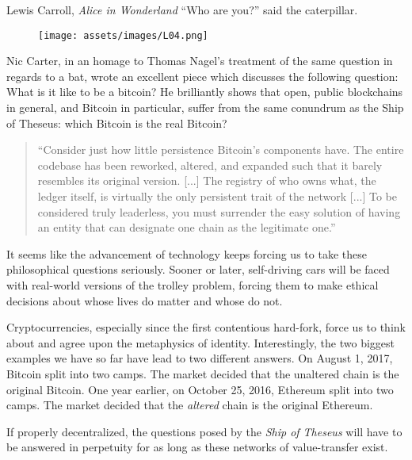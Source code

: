 \label{les:4}

\begin{chapquote}{Lewis Carroll, \textit{Alice in Wonderland}}
  ``Who are you?'' said the caterpillar.
\end{chapquote}

\begin{figure}
  \texttt{[image: assets/images/L04.png]}
  \label{fig:caterpillar}
\end{figure}

Nic Carter, in an homage to Thomas Nagel's treatment of the same
question in regards to a bat, wrote an excellent piece which discusses
the following question: What is it like to be a bitcoin? He
brilliantly shows that open, public blockchains in general, and Bitcoin
in particular, suffer from the same conundrum as the Ship of
Theseus: which Bitcoin is the real Bitcoin?

\begin{quotation}
``Consider just how little persistence Bitcoin's components have. The
entire codebase has been reworked, altered, and expanded such that it
barely resembles its original version. [...] The registry of who
owns what, the ledger itself, is virtually the only persistent trait
of the network [...]
To be considered truly leaderless, you must surrender the easy
solution of having an entity that can designate one chain as the
legitimate one.''
\end{quotation}

It seems like the advancement of technology keeps forcing us to take
these philosophical questions seriously. Sooner or later, self-driving
cars will be faced with real-world versions of the trolley problem,
forcing them to make ethical decisions about whose lives do matter and
whose do not.

Cryptocurrencies, especially since the first contentious hard-fork,
force us to think about and agree upon the metaphysics of identity.
Interestingly, the two biggest examples we have so far have lead to two
different answers. On August 1, 2017, Bitcoin split into two camps. The
market decided that the unaltered chain is the original Bitcoin. One
year earlier, on October 25, 2016, Ethereum split into two camps. The
market decided that the \textit{altered} chain is the original Ethereum.

If properly decentralized, the questions posed by the \textit{Ship of Theseus}
will have to be answered in perpetuity for as long as these networks of
value-transfer exist.

